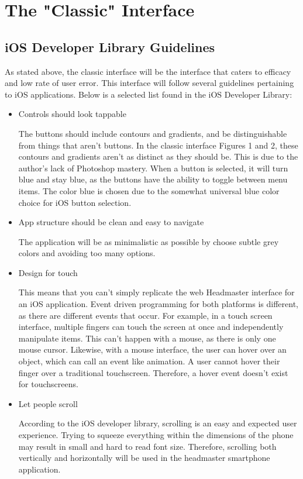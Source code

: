 \documentclass{article}
\begin{document}
\section{The "Classic" Interface}
\label{The "Classic" Interface}

\subsection{iOS Developer Library Guidelines}

As stated above, the classic interface will be the interface that caters to efficacy and low rate of user error.  This interface will follow several guidelines pertaining to iOS applications.  Below is a selected list found in the iOS Developer Library\cite{iOSDevLib}:\\

\begin{itemize}
\item  Controls should look tappable

The buttons should include contours and gradients, and be distinguishable from things that aren’t buttons.  In the classic interface Figures 1 and 2, these contours and gradients aren’t as distinct as they should be.  This is due to the author’s lack of Photoshop mastery.  When a button is selected, it will turn blue and stay blue, as the buttons have the ability to toggle between menu items.  The color blue is chosen due to the somewhat universal blue color choice for iOS button selection.\\

\item App structure should be clean and easy to navigate

The application will be as minimalistic as possible by choose subtle grey colors and avoiding too many options.\\

\item Design for touch

This means that you can’t simply replicate the web Headmaster interface for an iOS application.  Event driven programming for both platforms is different, as there are different events that occur.  For example, in a touch screen interface, multiple fingers can touch the screen at once and independently manipulate items.  This can’t happen with a mouse, as there is only one mouse cursor.  Likewise, with a mouse interface, the user can hover over an object, which can call an event like animation.  A user cannot hover their finger over a traditional touchscreen.  Therefore, a hover event doesn’t exist for touchscreens.\\

\item Let people scroll

According to the iOS developer library, scrolling is an easy and expected user experience.  Trying to squeeze everything within the dimensions of the phone may result in small and hard to read font size.  Therefore, scrolling both vertically and horizontally will be used in the headmaster smartphone application.\\
\end{itemize}
\end{document}
